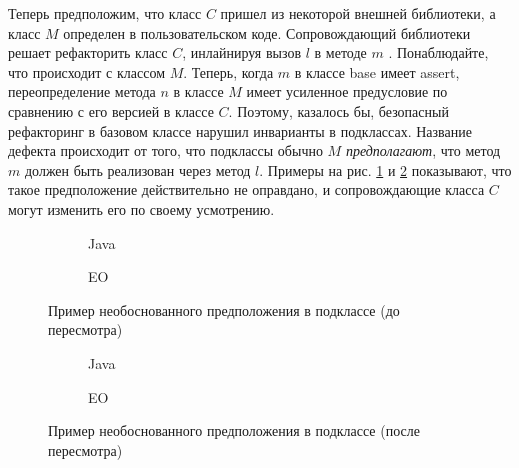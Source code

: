 Теперь предположим, что класс $C$ пришел из некоторой внешней библиотеки, а класс $M$ определен в пользовательском коде. Сопровождающий библиотеки решает рефакторить класс $C$, инлайнируя вызов $l$ в методе $m$ . Понаблюдайте, что происходит с классом $M$. Теперь, когда $m$ в классе base имеет assert, переопределение метода $n$ в классе $M$ имеет усиленное предусловие по сравнению с его версией в классе $C$. Поэтому, казалось бы, безопасный рефакторинг в базовом классе нарушил инварианты в подклассах. Название дефекта происходит от того, что подклассы обычно $M$ \textit{предполагают}, что метод $m$ должен быть реализован через метод $l$. Примеры на рис. \ref{fig:unjustified_before} и \ref{fig:unjustified_after} показывают, что такое предположение действительно не оправдано, и сопровождающие класса $C$ могут изменить его по своему усмотрению.

\begin{figure}
    \centering
    \begin{subfigure}{0.4\textwidth}
        
        \caption{Java}
    \end{subfigure}
    \hfill
    \begin{subfigure}{0.4\textwidth}
        
        \caption{EO}
    \end{subfigure}
    \caption{Пример необоснованного предположения в подклассе (до пересмотра)}
    \label{fig:unjustified_before}
\end{figure}

\begin{figure}
    \centering
    \begin{subfigure}{0.4\textwidth}
        
        \caption{Java}
    \end{subfigure}
    \hfill
    \begin{subfigure}{0.4\textwidth}
        
        \caption{EO}
    \end{subfigure}
    \caption{Пример необоснованного предположения в подклассе (после пересмотра)}
    \label{fig:unjustified_after}
\end{figure}



\newpage
